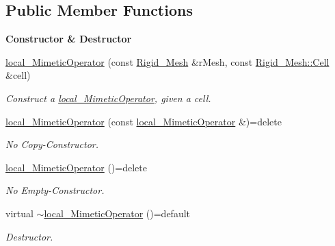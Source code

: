 \subsection*{Public Member Functions}
\begin{Indent}{\bf Constructor \& Destructor}\par
\begin{DoxyCompactItemize}
\item 
\hyperlink{classFVCode3D_1_1local__MimeticOperator_acea81a53f6e046ebc48b5a701cbb73b0}{local\+\_\+\+Mimetic\+Operator} (const \hyperlink{classFVCode3D_1_1Rigid__Mesh}{Rigid\+\_\+\+Mesh} \&r\+Mesh, const \hyperlink{classFVCode3D_1_1Rigid__Mesh_1_1Cell}{Rigid\+\_\+\+Mesh\+::\+Cell} \&cell)
\begin{DoxyCompactList}\small\item\em Construct a \hyperlink{classFVCode3D_1_1local__MimeticOperator}{local\+\_\+\+Mimetic\+Operator}, given a cell. \end{DoxyCompactList}\item 
\hyperlink{classFVCode3D_1_1local__MimeticOperator_ae5a36264b07d4da5bdce29582dfa4fe7}{local\+\_\+\+Mimetic\+Operator} (const \hyperlink{classFVCode3D_1_1local__MimeticOperator}{local\+\_\+\+Mimetic\+Operator} \&)=delete
\begin{DoxyCompactList}\small\item\em No Copy-\/\+Constructor. \end{DoxyCompactList}\item 
\hyperlink{classFVCode3D_1_1local__MimeticOperator_af70d5b13edb21afd8b3e7c12c2aa7aa6}{local\+\_\+\+Mimetic\+Operator} ()=delete
\begin{DoxyCompactList}\small\item\em No Empty-\/\+Constructor. \end{DoxyCompactList}\item 
virtual \hyperlink{classFVCode3D_1_1local__MimeticOperator_a28d725299b33aa2685b734883df21f6b}{$\sim$local\+\_\+\+Mimetic\+Operator} ()=default
\begin{DoxyCompactList}\small\item\em Destructor. \end{DoxyCompactList}\end{DoxyCompactItemize}
\end{Indent}
